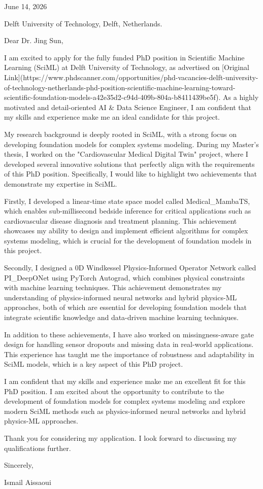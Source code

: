 \documentclass{letter}
\begin{document}
\opening{June 14, 2026}

Delft University of Technology,
Delft, Netherlands.

Dear Dr. Jing Sun,

I am excited to apply for the fully funded PhD position in Scientific Machine Learning (SciML) at Delft University of Technology, as advertised on [Original Link](https://www.phdscanner.com/opportunities/phd-vacancies-delft-university-of-technology-netherlands-phd-position-scientific-machine-learning-toward-scientific-foundation-models-a42e35d2-c94d-409b-804a-b8411439be5f). As a highly motivated and detail-oriented AI & Data Science Engineer, I am confident that my skills and experience make me an ideal candidate for this project.

My research background is deeply rooted in SciML, with a strong focus on developing foundation models for complex systems modeling. During my Master's thesis, I worked on the "Cardiovascular Medical Digital Twin" project, where I developed several innovative solutions that perfectly align with the requirements of this PhD position. Specifically, I would like to highlight two achievements that demonstrate my expertise in SciML.

Firstly, I developed a linear-time state space model called Medical_MambaTS, which enables sub-millisecond bedside inference for critical applications such as cardiovascular disease diagnosis and treatment planning. This achievement showcases my ability to design and implement efficient algorithms for complex systems modeling, which is crucial for the development of foundation models in this project.

Secondly, I designed a 0D Windkessel Physics-Informed Operator Network called PI_DeepONet using PyTorch Autograd, which combines physical constraints with machine learning techniques. This achievement demonstrates my understanding of physics-informed neural networks and hybrid physics-ML approaches, both of which are essential for developing foundation models that integrate scientific knowledge and data-driven machine learning techniques.

In addition to these achievements, I have also worked on missingness-aware gate design for handling sensor dropouts and missing data in real-world applications. This experience has taught me the importance of robustness and adaptability in SciML models, which is a key aspect of this PhD project.

I am confident that my skills and experience make me an excellent fit for this PhD position. I am excited about the opportunity to contribute to the development of foundation models for complex systems modeling and explore modern SciML methods such as physics-informed neural networks and hybrid physics-ML approaches.

Thank you for considering my application. I look forward to discussing my qualifications further.

Sincerely,

Ismail Aissaoui

\closing{}
\end{document}

